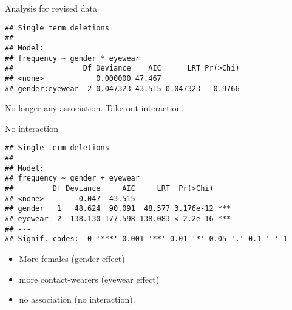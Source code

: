 \begin{frame}[fragile]{Analysis for revised data}
  
\begin{knitrout}
\color{fgcolor}\begin{kframe}
\begin{alltt}
\hlkwb{=}\hlopt{~}\hlopt{*}
  \hlstd{=}\hlstd{)}
\hlstd{=}\hlstd{)}
\end{alltt}
\begin{verbatim}
## Single term deletions
## 
## Model:
## frequency ~ gender * eyewear
##                Df Deviance    AIC      LRT Pr(>Chi)
## <none>            0.000000 47.467                  
## gender:eyewear  2 0.047323 43.515 0.047323   0.9766
\end{verbatim}
\end{kframe}
\end{knitrout}

No longer any association. Take out interaction.
  
\end{frame}

\begin{frame}[fragile]{No interaction}
  
  {\small
\begin{knitrout}
\color{fgcolor}\begin{kframe}
\begin{alltt}
\hlkwb{=}\hlopt{~}\hlopt{-}\hlopt{:}
\hlstd{=}\hlstd{)}
\end{alltt}
\begin{verbatim}
## Single term deletions
## 
## Model:
## frequency ~ gender + eyewear
##         Df Deviance     AIC     LRT  Pr(>Chi)    
## <none>        0.047  43.515                      
## gender   1   48.624  90.091  48.577 3.176e-12 ***
## eyewear  2  138.130 177.598 138.083 < 2.2e-16 ***
## ---
## Signif. codes:  0 '***' 0.001 '**' 0.01 '*' 0.05 '.' 0.1 ' ' 1
\end{verbatim}
\end{kframe}
\end{knitrout}
}
\begin{itemize}
\item More females (gender effect)
\item more contact-wearers (eyewear
  effect)
\item no association (no interaction). 
\end{itemize}
  
\end{frame}


